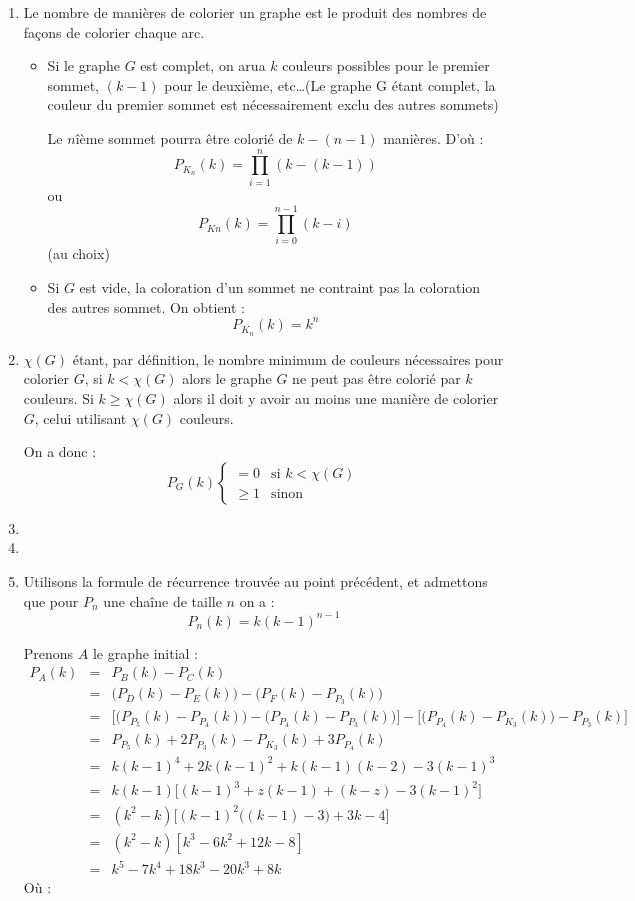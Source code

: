 \begin{enumerate}
\item Le nombre de manières de colorier un graphe est le produit des nombres de façons de colorier chaque arc.
\begin{itemize}
\item Si le graphe $G$ est complet, on arua $k$ couleurs possibles pour le premier sommet, $(k-1)$ pour le deuxième, etc\ldots (Le graphe G étant complet, la couleur du premier sommet est nécessairement exclu des autres sommets)

Le $n$\^{ième} sommet pourra être colorié de $k-(n-1)$ manières. D'où :
\[ P_{K_n}(k)=\prod_{i=1}^{n} \left( k-(k-1) \right)\]
ou
\[ P_{Kn}(k)=\prod_{i=0}^{n-1}(k-i) \]
(au choix)

\item Si $G$ est vide, la coloration d'un sommet ne contraint pas la coloration des autres sommet. On obtient :
\[ P_{\overline{K_n}}(k)=k^n \]
\end{itemize}
\item $\chi(G)$ étant, par définition, le nombre minimum de couleurs nécessaires pour colorier $G$, si $k < \chi(G)$ alors le graphe $G$ ne peut pas être colorié par $k$ couleurs. Si $k \geq \chi(G)$ alors il doit y avoir au moins une manière de colorier $G$, celui utilisant $\chi(G)$ couleurs.

On a donc :
\begin{displaymath}
	P_G(k) \left\{ \begin{array}{ll}
	=0 & \textrm{si $k < \chi(G)$} \\
	\geq 1 & \textrm{sinon}
	\end{array} \right.
\end{displaymath}

\item 
\item
\item Utilisons la formule de récurrence trouvée au point précédent, et admettons que pour $P_n$ une chaîne de taille $n$ on a :
\[ P_n(k) = k(k-1)^{n-1} \]

Prenons $A$ le graphe initial :
\begin{eqnarray*}
P_A(k) & = & P_B(k) - P_C(k) \\
&=& \big(P_D(k)-P_E(k)\big)-\big(P_F(k)-P_{P_3}(k)\big)\\
&=& \Big[\big(P_{P_5}(k)-P_{P_4}(k)\big)-\big(P_{P_4}(k)-P_{P_3}(k)\big)\Big]-\Big[\big(P_{P_4}(k)-P_{K_3}(k)\big)-P_{P_3}(k)\Big]\\
&=& P_{P_5}(k)+2P_{P_3}(k)-P_{K_3}(k)+3P_{P_4}(k)\\
&=& k(k-1)^4 +2k(k-1)^2+k(k-1)(k-2)-3(k-1)^3 \\
&=& k(k-1)\big[(k-1)^3+z(k-1)+(k-z)-3(k-1)^2\big]\\
&=& (k^2-k)\Big[(k-1)^2\big((k-1)-3\big)+3k -4 \Big]\\
&=& (k^2-k)[k^3-6k^2+12k-8]\\
&=& k^5-7k^4+18k^3-20k^3+8k
\end{eqnarray*}
Où :


\end{enumerate}
